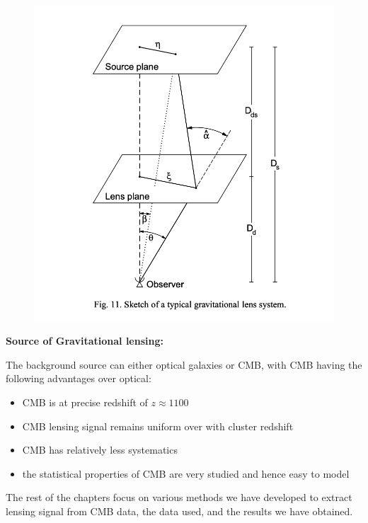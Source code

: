 \begin{figure}[H]
\includegraphics[width = \columnwidth]{figs/schematic_grav_lens.png}
\caption{}
\label{grav_lens}
\end{figure}

\textbf{Source of Gravitational lensing:}

The background source can either optical galaxies or CMB, with CMB having the following advantages over optical:
\begin{itemize}
\item CMB is at precise redshift of $z \approx 1100$%
\item CMB lensing signal remains uniform over with cluster redshift
\item CMB has relatively less systematics
\item the statistical properties of CMB are very studied and hence easy to model
\end{itemize}
The rest of the chapters focus on various methods we have developed to extract lensing signal from CMB data, the data used, and the results we have obtained. 



  

 

 
 

   